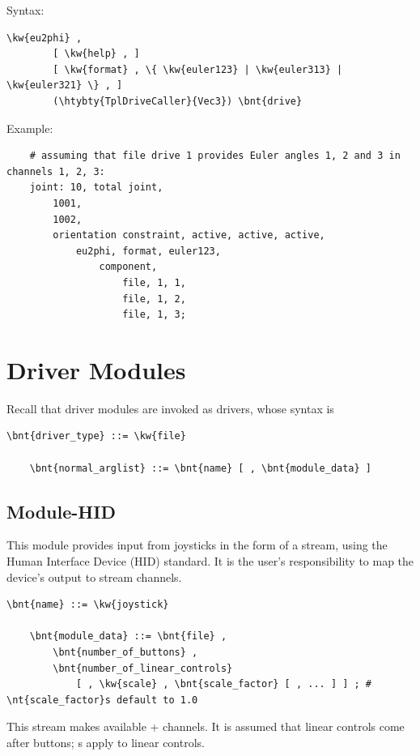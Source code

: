 Syntax:
\begin{Verbatim}[commandchars=\\\{\}]
    \kw{eu2phi} ,
        [ \kw{help} , ]
        [ \kw{format} , \{ \kw{euler123} | \kw{euler313} | \kw{euler321} \} , ]
        (\htybty{TplDriveCaller}{Vec3}) \bnt{drive}
\end{Verbatim}
Example:
\begin{verbatim}
    # assuming that file drive 1 provides Euler angles 1, 2 and 3 in channels 1, 2, 3:
    joint: 10, total joint,
        1001,
        1002,
        orientation constraint, active, active, active,
            eu2phi, format, euler123,
                component,
                    file, 1, 1,
                    file, 1, 2,
                    file, 1, 3;
\end{verbatim}


\section{Driver Modules}
Recall that driver modules are invoked as  drivers,
whose syntax is
\begin{Verbatim}[commandchars=\\\{\}]
    \bnt{driver_type} ::= \kw{file}

    \bnt{normal_arglist} ::= \bnt{name} [ , \bnt{module_data} ]
\end{Verbatim}



\subsection{Module-HID}
This module provides input from joysticks in the form of a stream,
using the Human Interface Device (HID) standard.
It is the user's responsibility to map the device's output to stream channels.

\begin{Verbatim}[commandchars=\\\{\}]
    \bnt{name} ::= \kw{joystick}

    \bnt{module_data} ::= \bnt{file} ,
        \bnt{number_of_buttons} ,
        \bnt{number_of_linear_controls}
            [ , \kw{scale} , \bnt{scale_factor} [ , ... ] ] ; # \nt{scale_factor}s default to 1.0
\end{Verbatim}
This stream makes available  +  channels.
It is assumed that linear controls come after buttons;
s apply to linear controls.

